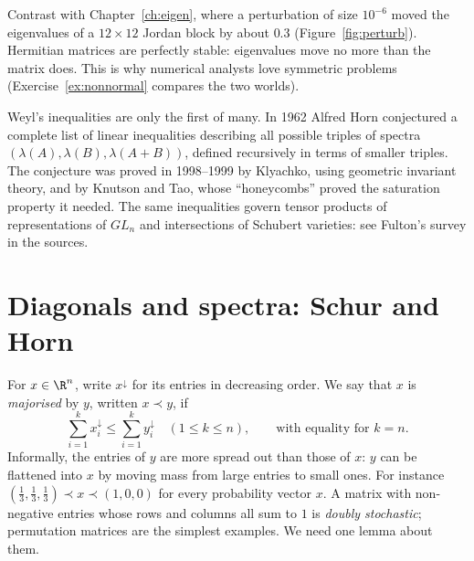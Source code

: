 Contrast with Chapter~\ref{ch:eigen}, where a perturbation of size $10^{-6}$ moved the eigenvalues of a $12\times12$ Jordan
block by about $0.3$ (Figure~\ref{fig:perturb}). Hermitian matrices are perfectly stable: eigenvalues move no more than the matrix does.
This is why numerical analysts love symmetric problems (Exercise~\ref{ex:nonnormal} compares the two worlds).

\begin{remark}
Weyl's inequalities are only the first of many. In 1962 Alfred Horn conjectured a complete list of linear inequalities
describing all possible triples of spectra $(\lambda(A),\lambda(B),\lambda(A+B))$, defined recursively in terms of smaller
triples. The conjecture was proved in 1998--1999 by Klyachko, using geometric invariant theory, and by Knutson and Tao,
whose ``honeycombs'' proved the saturation property it needed. The same inequalities govern tensor products of
representations of $GL_n$ and intersections of Schubert varieties: see Fulton's survey in the sources.
\end{remark}

\section{Diagonals and spectra: Schur and Horn}\label{sec:schurhorn}

For $x\in\R^n$, write $x^\downarrow$ for its entries in decreasing order. We say that $x$ is \emph{majorised} by $y$, written
$x\prec y$, if
\[
\sum_{i=1}^kx^\downarrow_i\le\sum_{i=1}^ky^\downarrow_i\quad(1\le k\le n),\qquad\text{with equality for }k=n.
\]
Informally, the entries of $y$ are more spread out than those of $x$: $y$ can be flattened into $x$ by moving mass from
large entries to small ones. For instance $(\frac13,\frac13,\frac13)\prec x\prec(1,0,0)$ for every probability vector $x$. A matrix with
non-negative entries whose rows and columns all sum to $1$ is \emph{doubly stochastic}; permutation matrices are the
simplest examples. We need one lemma about them.

